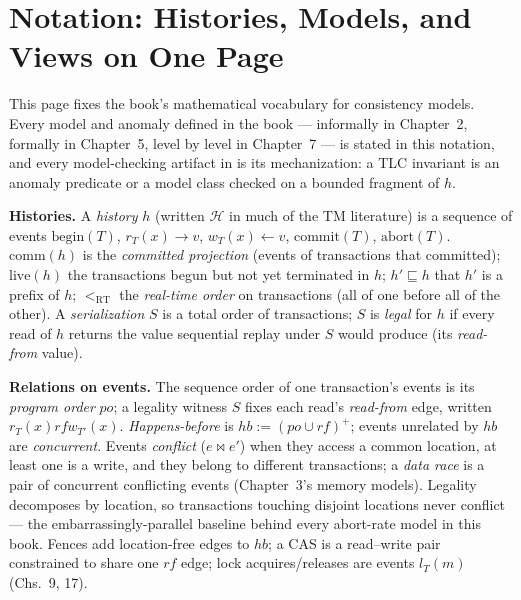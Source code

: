 \chapter*{Notation: Histories, Models, and Views on One Page}
\label{cha:notation}

This page fixes the book's mathematical vocabulary for consistency models.
Every model and anomaly defined in the book --- informally in Chapter~2,
formally in Chapter~5, level by level in Chapter~7 --- is stated in this
notation, and every model-checking artifact in  is its
mechanization: a TLC invariant is an anomaly predicate or a model class
checked on a bounded fragment of $h$.

\medskip
\noindent\textbf{Histories.} A \emph{history} $h$ (written
$\mathcal{H}$ in much of the TM literature) is a sequence of events
$\mathrm{begin}(T)$, $r_T(x)\!\to\!v$, $w_T(x)\!\leftarrow\!v$,
$\mathrm{commit}(T)$, $\mathrm{abort}(T)$.
$\mathrm{comm}(h)$ is the \emph{committed projection} (events of
transactions that committed); $\mathrm{live}(h)$ the transactions begun but
not yet terminated in $h$; $h' \sqsubseteq h$ that $h'$ is a prefix of $h$;
$<_{\mathrm{RT}}$ the \emph{real-time order} on transactions (all of one
before all of the other). A \emph{serialization} $S$ is a total order of
transactions; $S$ is \emph{legal} for $h$ if every read of $h$ returns the
value sequential replay under $S$ would produce (its \emph{read-from}
value).

\medskip
\noindent\textbf{Relations on events.} The sequence order of one
transaction's events is its \emph{program order} $\mathit{po}$; a legality
witness $S$ fixes each read's \emph{read-from} edge, written
$r_T(x)\mathrel{\mathit{rf}}w_{T'}(x)$. \emph{Happens-before} is
$\mathit{hb}:= (\mathit{po}\cup\mathit{rf})^+$; events unrelated by
$\mathit{hb}$ are \emph{concurrent}. Events \emph{conflict}
($e \bowtie e'$) when they access a common location, at least one is a
write, and they belong to different transactions; a \emph{data race} is a
pair of concurrent conflicting events (Chapter~3's memory models).
Legality decomposes by location, so transactions touching disjoint
locations never conflict --- the embarrassingly-parallel baseline behind
every abort-rate model in this book. Fences add location-free edges to
$\mathit{hb}$; a CAS is a read--write pair constrained to share one
$\mathit{rf}$ edge; lock acquires/releases are events $l_T(m)$
(Chs.~9, 17).

